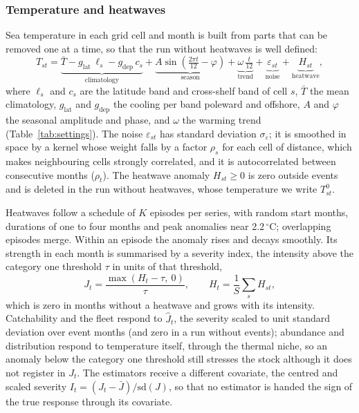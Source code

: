 \documentclass[11pt,a4paper]{article}
\newcommand{\vt}[1]{\text{#1}}
\begin{document}
\subsubsection{Temperature and heatwaves}

Sea temperature in each grid cell and month is built from parts that can be removed one at a time, so that the run without heatwaves is well defined:
\begin{equation}
T_{st} = \underbrace{\bar{T} - g_{\vt{lat}}\,\ell_s - g_{\vt{dep}}\,c_s}_{\vt{climatology}} + \underbrace{A\sin\!\left(\tfrac{2\pi t}{12} - \varphi\right)}_{\vt{season}} + \underbrace{\omega\,\tfrac{t}{12}}_{\vt{trend}} + \underbrace{\varepsilon_{st}}_{\vt{noise}} + \underbrace{H_{st}}_{\vt{heatwave}} ,
\label{eq:temp}
\end{equation}
where $\ell_s$ and $c_s$ are the latitude band and cross-shelf band of cell $s$, $\bar T$ the mean climatology, $g_{\vt{lat}}$ and $g_{\vt{dep}}$ the cooling per band poleward and offshore, $A$ and $\varphi$ the seasonal amplitude and phase, and $\omega$ the warming trend (Table~\ref{tab:settings}). The noise $\varepsilon_{st}$ has standard deviation $\sigma_\varepsilon$; it is smoothed in space by a kernel whose weight falls by a factor $\rho_s$ for each cell of distance, which makes neighbouring cells strongly correlated, and it is autocorrelated between consecutive months ($\rho_t$). The heatwave anomaly $H_{st}\ge0$ is zero outside events and is deleted in the run without heatwaves, whose temperature we write $T^0_{st}$.

Heatwaves follow a schedule of $K$ episodes per series, with random start months, durations of one to four months and peak anomalies near 2.2\,$^\circ$C; overlapping episodes merge. Within an episode the anomaly rises and decays smoothly. Its strength in each month is summarised by a severity index, the intensity above the category one threshold $\tau$ in units of that threshold,
\begin{equation}
J_t = \frac{\max(H_t - \tau,\ 0)}{\tau}, \qquad H_t = \frac{1}{S}\sum_s H_{st},
\label{eq:severity}
\end{equation}
which is zero in months without a heatwave and grows with its intensity. Catchability and the fleet respond to $\hat J_t$, the severity scaled to unit standard deviation over event months (and zero in a run without events); abundance and distribution respond to temperature itself, through the thermal niche, so an anomaly below the category one threshold still stresses the stock although it does not register in $J_t$. The estimators receive a different covariate, the centred and scaled severity $I_t = (J_t - \bar J)/\mathrm{sd}(J)$, so that no estimator is handed the sign of the true response through its covariate.
\end{document}
